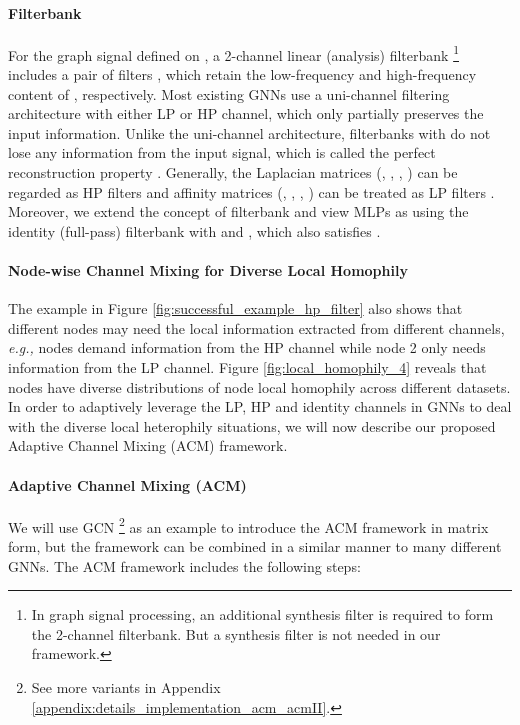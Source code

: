 \documentclass{article}
\newcommand\eg{\textit{e.g.,}}
\newcommand{\0}{{\boldsymbol{0}}}
\newcommand{\6}{{\partial}}
\newcommand{\8}{{\infty}}
\newcommand{\4}{{\nabla}}
\begin{document}
\paragraph{Filterbank} For the graph signal  defined on , a 2-channel linear (analysis) filterbank \cite{ekambaram2014graph} \footnote{In graph signal processing, an additional synthesis filter \cite{ekambaram2014graph} is required to form the 2-channel filterbank. But a synthesis filter is not needed in our framework.} includes a pair of  filters , which retain the low-frequency and high-frequency content of , respectively.
Most existing GNNs use a uni-channel filtering architecture \cite{kipf2016classification,velivckovic2017attention,hamilton2017inductive} with either LP or HP channel, which only partially preserves the input information. Unlike the uni-channel architecture, filterbanks with  do not lose any information from the input signal, which is called the perfect reconstruction property \cite{ekambaram2014graph}. Generally, the Laplacian matrices (, , , ) can be regarded as HP filters \cite{ekambaram2014graph} and affinity matrices (, , , ) can be treated as LP filters \cite{maehara2019revisiting, hamilton2020graph}. Moreover,  we extend the concept of filterbank and view MLPs as using the identity (full-pass) filterbank with  and , which also satisfies . \vspace{-0.3cm}
\paragraph{Node-wise Channel Mixing for Diverse Local Homophily} The example in Figure \ref{fig:successful_example_hp_filter} also shows that different nodes may need the local information extracted from different channels, \eg{} nodes  demand information from the HP channel while node 2 only needs information from the LP channel. Figure \ref{fig:local_homophily_4} reveals that nodes have diverse distributions of node local homophily  across different datasets. In order to adaptively leverage the LP, HP and identity channels in GNNs to deal with the diverse local heterophily situations, we will now describe our proposed Adaptive Channel Mixing (ACM) framework.
\vspace{-0.2cm}
\paragraph{Adaptive Channel Mixing (ACM)}
We will use GCN \footnote{See more variants in Appendix \ref{appendix:details_implementation_acm_acmII}.} as an example to introduce the ACM framework in matrix form, but the framework can be combined in a similar manner to many different GNNs.
The ACM framework includes the following steps:
\vspace{-0.1cm}
\end{document}
